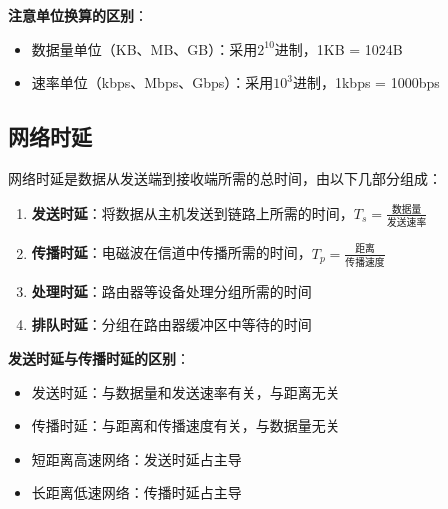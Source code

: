 \documentclass[12pt,a4paper,openany]{ctexbook}
\begin{document}
\begin{tipbox}
\textbf{注意单位换算的区别}：
\begin{itemize}[itemsep=0pt]
    \item 数据量单位（KB、MB、GB）：采用$2^{10}$进制，1KB = 1024B
    \item 速率单位（kbps、Mbps、Gbps）：采用$10^3$进制，1kbps = 1000bps
\end{itemize}
\end{tipbox}

\subsection{网络时延}
网络时延是数据从发送端到接收端所需的总时间，由以下几部分组成：

\begin{enumerate}[leftmargin=2em,itemsep=0pt]
    \item \textbf{发送时延}：将数据从主机发送到链路上所需的时间，$T_s = \frac{\text{数据量}}{\text{发送速率}}$
    \item \textbf{传播时延}：电磁波在信道中传播所需的时间，$T_p = \frac{\text{距离}}{\text{传播速度}}$
    \item \textbf{处理时延}：路由器等设备处理分组所需的时间
    \item \textbf{排队时延}：分组在路由器缓冲区中等待的时间
\end{enumerate}

\begin{center}
\end{center}

\begin{notebox}
\textbf{发送时延与传播时延的区别}：
\begin{itemize}[itemsep=0pt]
    \item 发送时延：与数据量和发送速率有关，与距离无关
    \item 传播时延：与距离和传播速度有关，与数据量无关
    \item 短距离高速网络：发送时延占主导
    \item 长距离低速网络：传播时延占主导
\end{itemize}
\end{notebox}
\end{document}
